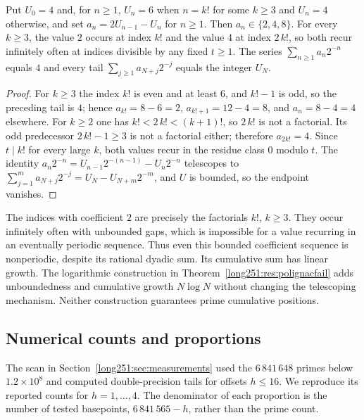 \documentclass[11pt]{article}
\begin{document}
\begin{proposition}\label{long251:xr:boundedpolignac}
Put $U_0=4$ and, for $n\ge1$, $U_n=6$ when $n=k!$ for some $k\ge3$ and $U_n=4$
otherwise, and set $a_n=2U_{n-1}-U_n$ for $n\ge1$.  Then $a_n\in\{2,4,8\}$.
For every $k\ge3$, the value $2$ occurs at index $k!$ and the value $4$
at index $2\,k!$, so both recur infinitely often at indices divisible by any fixed
$t\ge1$.  The series $\sum_{n\ge1}a_n2^{-n}$ equals $4$ and every tail
$\sum_{j\ge1}a_{N+j}2^{-j}$ equals the integer $U_N$.
\end{proposition}

\begin{proof}
For $k\ge3$ the index $k!$ is even and at least $6$, and $k!-1$ is odd, so the
preceding tail is $4$; hence $a_{k!}=8-6=2$,
$a_{k!+1}=12-4=8$, and $a_n=8-4=4$ elsewhere.  For $k\ge2$ one has
$k!<2\,k!<(k+1)!$, so $2\,k!$ is not a factorial.  Its odd predecessor
$2\,k!-1\ge3$ is not a factorial either; therefore $a_{2k!}=4$.  Since $t\mid k!$ for every
large $k$, both values recur in the residue class $0$ modulo $t$.  The identity
$a_n2^{-n}=U_{n-1}2^{-(n-1)}-U_n2^{-n}$ telescopes to
$\sum_{j=1}^{m}a_{N+j}2^{-j}=U_N-U_{N+m}2^{-m}$, and $U$ is bounded, so the
endpoint vanishes.
\end{proof}

The indices with coefficient $2$ are precisely the factorials $k!$,
$k\ge3$.  They occur infinitely often with unbounded gaps, which is
impossible for a value recurring in an eventually periodic sequence.
Thus even this bounded coefficient sequence is nonperiodic, despite its
rational dyadic sum.  Its cumulative sum has linear growth.
The logarithmic construction in
Theorem~\ref{long251:res:polignacfail} adds unboundedness and cumulative
growth $N\log N$ without changing the telescoping mechanism.  Neither
construction guarantees prime cumulative positions.

\subsection{Numerical counts and proportions}\label{long251:sec:xr-densities}

The scan in Section~\ref{long251:sec:measurements} used the
$6\,841\,648$ primes below $1.2\times10^8$ and computed double-precision
tails for offsets $h\le16$.  We reproduce its reported counts for
$h=1,\ldots,4$.  The denominator of each proportion is the number of
tested basepoints, $6\,841\,565-h$, rather than the prime count.
\end{document}

